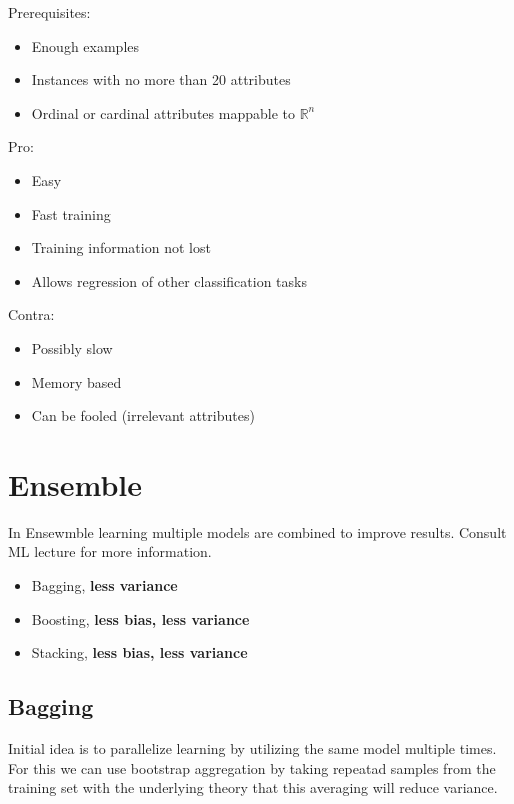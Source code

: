 \documentclass[../Main.tex]{subfiles}
\begin{document}
Prerequisites:
\begin{itemize}
    \item Enough examples
    \item Instances with no more than 20 attributes
    \item Ordinal or cardinal attributes mappable to \(\mathbb{R}^n\)
\end{itemize}

Pro:
\begin{itemize}
    \item Easy
    \item Fast training
    \item Training information not lost
    \item Allows regression of other classification tasks
\end{itemize}

Contra:
\begin{itemize}
    \item Possibly slow
    \item Memory based
    \item Can be fooled (irrelevant attributes)
\end{itemize}


\section{Ensemble}
In Ensewmble learning multiple models are combined to improve results.
Consult ML lecture for more information.
\begin{itemize}
    \item Bagging, \textbf{less variance}
    \item Boosting, \textbf{less bias, less variance}
    \item Stacking, \textbf{less bias, less variance}
\end{itemize}

\subsection{Bagging}
Initial idea is to parallelize learning by utilizing the same model multiple times.
For this we can use bootstrap aggregation by taking repeatad samples from the training set
with the underlying theory that this averaging will reduce variance.
\end{document}
